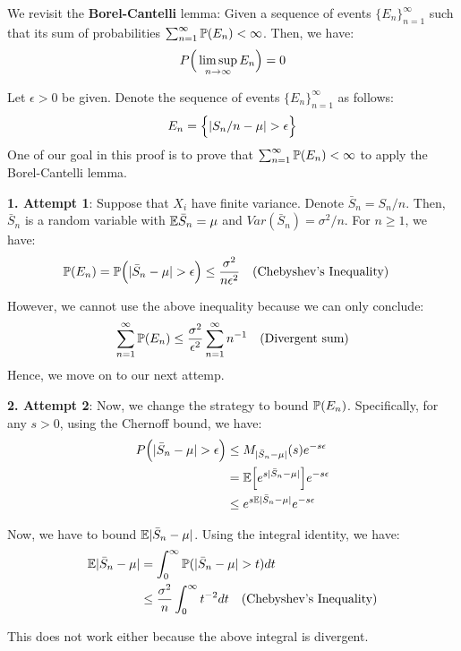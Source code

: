 \begin{proof*}
    We revisit the \textbf{Borel-Cantelli} lemma: Given a sequence of events $\{E_n\}_{n=1}^\infty$ such that its sum of probabilities $\sum_{n=1}^\infty \mathbb{P}(E_n) < \infty$. Then, we have:
    \begin{align}
        P\Big( 
            \limsup_{n\to\infty} E_n 
         \Big) = 0
    \end{align}
    
    \noindent Let $\epsilon>0$ be given. Denote the sequence of events $\{E_n\}_{n=1}^\infty$ as follows:
    \begin{align*}
        E_n = \Big\{ 
            | S_n / n - \mu | > \epsilon
         \Big\}
    \end{align*} 
    \noindent One of our goal in this proof is to prove that $\sum_{n=1}^\infty \mathbb{P}(E_n)<\infty$ to apply the Borel-Cantelli lemma.

    \noindent\newline\textbf{1. Attempt 1}: Suppose that $X_i$ have finite variance. Denote $\bar S_n = S_n/n$. Then, $\bar S_n$ is a random variable with $\mathbb{E} \bar S_n=\mu$ and $Var(\bar S_n)=\sigma^2/n$. For $n\ge1$, we have:
    \begin{align*}
        \mathbb{P}(E_n) &= \mathbb{P}\Big( |\bar S_n - \mu| > \epsilon \Big) \le \frac{\sigma^2}{n\epsilon^2} \ \ \ (\text{Chebyshev's Inequality})
    \end{align*}

    \noindent However, we cannot use the above inequality because we can only conclude:
    \begin{align*}
        \sum_{n=1}^\infty \mathbb{P}(E_n) \le \frac{\sigma^2}{\epsilon^2} \sum_{n=1}^\infty n^{-1} \ \ \ (\text{Divergent sum})
    \end{align*}
    \noindent Hence, we move on to our next attemp.

    \noindent\newline\textbf{2. Attempt 2}: Now, we change the strategy to bound $\mathbb{P}(E_n)$. Specifically, for any $s>0$, using the Chernoff bound, we have:
    \begin{align*}
        P\Big( |\bar S_n - \mu| > \epsilon \Big) &\le M_{|\bar S_n - \mu|}(s) e^{-s\epsilon} \\
            &= \mathbb{E}\Big[ e^{s|\bar S_n - \mu|} \Big]e^{-s\epsilon} \\
            &\le e^{s\mathbb{E}|\bar S_n - \mu|}e^{-s\epsilon}
    \end{align*}

    \noindent Now, we have to bound $\mathbb{E}|\bar S_n - \mu|$. Using the integral identity, we have:
    \begin{align*}
        \E|\bar S_n - \mu| &= \int_0^\infty \Pm(|\bar S_n - \mu| > t)dt \\
            &\le \frac{\sigma^2}{n}\int_0^\infty t^{-2} dt \ \ \ (\text{Chebyshev's Inequality})
    \end{align*}

    \noindent This does not work either because the above integral is divergent.
\end{proof*}
